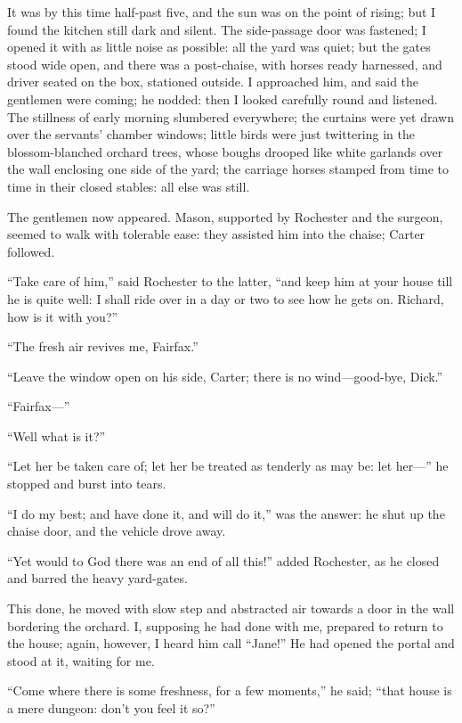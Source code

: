 It was by this time half-past five, and the sun was on the point of
rising; but I found the kitchen still dark and silent. The side-passage
door was fastened; I opened it with as little noise as possible: all the
yard was quiet; but the gates stood wide open, and there was a
post-chaise, with horses ready harnessed, and driver seated on the box,
stationed outside. I approached him, and said the gentlemen were
coming; he nodded: then I looked carefully round and listened. The
stillness of early morning slumbered everywhere; the curtains were yet
drawn over the servants' chamber windows; little birds were just
twittering in the blossom-blanched orchard trees, whose boughs drooped
like white garlands over the wall enclosing one side of the yard; the
carriage horses stamped from time to time in their closed stables: all
else was still.

The gentlemen now appeared. Mason, supported by \Mr{} Rochester and the
surgeon, seemed to walk with tolerable ease: they assisted him into the
chaise; Carter followed.

\enquote{Take care of him,} said \Mr{} Rochester to the latter,
\enquote{and keep him at your house till he is quite well: I shall ride
over in a day or two to see how he gets on. Richard, how is it with
you?}

\enquote{The fresh air revives me, Fairfax.}

\enquote{Leave the window open on his side, Carter; there is no
wind---good-bye, Dick.}

\enquote{Fairfax---}

\enquote{Well what is it?}

\enquote{Let her be taken care of; let her be treated as tenderly as may
be: let her---} he stopped and burst into tears.

\enquote{I do my best; and have done it, and will do it,} was the
answer: he shut up the chaise door, and the vehicle drove away.

\enquote{Yet would to God there was an end of all this!} added \Mr{}
 Rochester, as he closed and barred the heavy yard-gates.

This done, he moved with slow step and abstracted air towards a door in
the wall bordering the orchard. I, supposing he had done with me,
prepared to return to the house; again, however, I heard him call
\enquote{Jane!} He had opened the portal and stood at it, waiting for
me.

\enquote{Come where there is some freshness, for a few moments,} he
said; \enquote{that house is a mere dungeon: don't you feel it so?}

